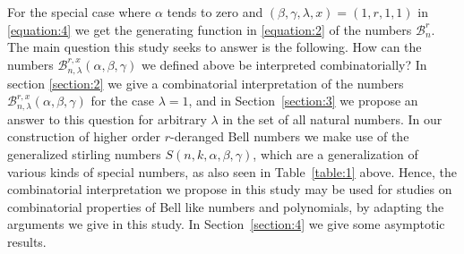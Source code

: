 \documentclass[12pt]{amsart}
\newtheorem{proof 1}{proof 1}
\begin{document}
For the special case where $\alpha$ tends to zero and $(\beta,\gamma,\lambda,x)=(1,r,1,1)$ in \eqref{equation:4} we get the generating function in \eqref{equation:2} of the numbers $\mathcal{B}^{r}_{n}$. The main question this study seeks to answer is the following. How can the numbers $\mathcal{B}^{r,x}_{n,\lambda}(\alpha,\beta,\gamma)$ we defined above be interpreted combinatorially? In section  \ref{section:2} we give a combinatorial interpretation of the numbers $\mathcal{B}^{r,x}_{n,\lambda}(\alpha,\beta,\gamma)$ for the case $\lambda=1$, and in Section~\ref{section:3} we propose an answer to this question for arbitrary $\lambda$ in the set of all natural numbers. In our construction of higher order $r$-deranged Bell numbers we make use of the generalized stirling numbers $S(n,k,\alpha,\beta,\gamma)$, which are a generalization of various kinds of special numbers, as also seen in Table~\ref*{table:1} above. Hence, the combinatorial interpretation we propose in this study may be used for studies on combinatorial properties of Bell like numbers and polynomials, by adapting the arguments we give in this study.   In Section~\ref{section:4} we give some asymptotic results. 

\end{document}
